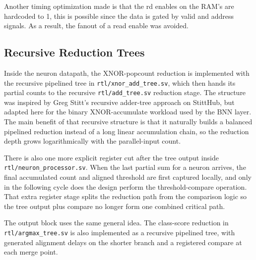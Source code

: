\begin{strip}
\begin{minipage}[t]{0.48\textwidth}
    Another timing optimization made is that the rd enables on the RAM's are hardcoded to 1,
    this is possible since the data is gated by valid and address signals. As a result, the fanout of a 
    read enable was avoided.
  \end{minipage}

  \vspace{0.75em}

  \centering
  \resizebox{0.86\textwidth}{!}{}
  \label{fig:bnn-layer-compute}
\end{strip}

\subsection{Recursive Reduction Trees}

Inside the neuron datapath, the XNOR-popcount reduction is implemented with the
recursive pipelined tree in \texttt{rtl/xnor\_add\_tree.sv}, which then hands
its partial counts to the recursive \texttt{rtl/add\_tree.sv} reduction stage.
The structure was inspired by Greg Stitt's recursive adder-tree approach on
StittHub, but adapted here for the binary XNOR-accumulate workload used by the
BNN layer. The main benefit of that recursive structure is that it naturally
builds a balanced pipelined reduction instead of a long linear accumulation
chain, so the reduction depth grows logarithmically with the parallel-input
count.

There is also one more explicit register cut after the tree output inside
\texttt{rtl/neuron\_processor.sv}. When the last partial sum for a neuron
arrives, the final accumulated count and aligned threshold are first captured
locally, and only in the following cycle does the design perform the
threshold-compare operation. That extra register stage splits the reduction path
from the comparison logic so the tree output plus compare no longer form one
combined critical path.

The output block uses the same general idea. The class-score reduction in
\texttt{rtl/argmax\_tree.sv} is also implemented as a recursive pipelined tree,
with generated alignment delays on the shorter branch and a registered compare
at each merge point.
\clearpage
